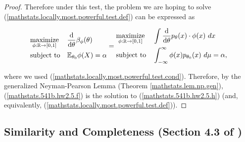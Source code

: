 \begin{proof}
Therefore under this test, the problem we are hoping to solve (\ref{mathstats.locally.most.powerful.test.def}) can be expressed as 


\begin{equation}\label{mathstats.541b.hw2.5.h}
\begin{aligned}
& \underset{\phi: \mathbb{R} \to [0,1]}{\text{maximize}}
& &  \deriv{}{\theta} \beta_\phi(\theta)   \\
& \text{subject to}
& & \E_{\theta_0} \phi(X) = \alpha
\end{aligned} 
= \begin{aligned}
& \underset{\phi: \mathbb{R} \to [0,1]}{\text{maximize}}
& & \int \deriv{}{\theta} p_\theta(x) \cdot \phi(x) \ dx \\
& \text{subject to}
& & \int_{-\infty}^\infty  \phi(x)  p_{\theta_0}(x)  \ d\mu = \alpha,
\end{aligned}
\end{equation}

where we used (\ref{mathstats.locally.most.powerful.test.cond}). Therefore, by the generalized Neyman-Pearson Lemma (Theorem \ref{mathstats.lem.np.gen}), (\ref{mathstats.541b.hw2.5.f}) is the solution to (\ref{mathstats.541b.hw2.5.h}) (and, equivalently, (\ref{mathstats.locally.most.powerful.test.def})).

%
%
%
%
\end{proof}


\subsection{Similarity and Completeness (Section 4.3 of \citet{lehmann2005testing})}

